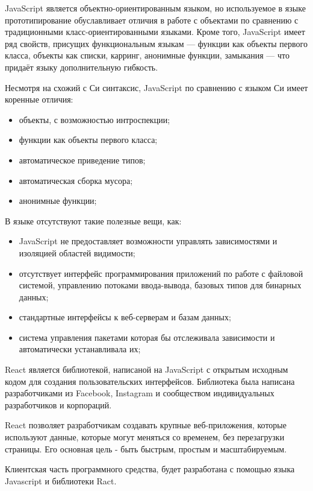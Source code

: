 JavaScript является объектно-ориентированным языком, но используемое в языке прототипирование обуславливает отличия в работе с объектами по сравнению с традиционными класс-ориентированными языками. Кроме того, JavaScript имеет ряд свойств, присущих функциональным языкам — функции как объекты первого класса, объекты как списки, карринг, анонимные функции, замыкания — что придаёт языку дополнительную гибкость.

Несмотря на схожий с Си синтаксис, JavaScript по сравнению с языком Си имеет коренные отличия:

\begin{itemize}
	\item объекты, с возможностью интроспекции;
	\item функции как объекты первого класса;
	\item автоматическое приведение типов;
	\item автоматическая сборка мусора;
	\item анонимные функции;
\end{itemize}

В языке отсутствуют такие полезные вещи, как:

\begin{itemize}
	\item JavaScript не предоставляет возможности управлять зависимостями и изоляцией областей видимости;
	\item отсутствует интерфейс программирования приложений по работе с файловой системой, управлению потоками ввода-вывода, базовых типов для бинарных данных;
	\item стандартные интерфейсы к веб-серверам и базам данных;
	\item система управления пакетами которая бы отслеживала зависимости и автоматически устанавливала их;
\end{itemize}

React является библиотекой, написаной на JavaScript с открытым исходным кодом для создания пользовательских интерфейсов. Библиотека была написана разработчиками из Facebook, Instagram и сообществом индивидуальных разработчиков и корпораций. 

React позволяет разработчикам создавать крупные веб-приложения, которые используют данные, которые могут меняться со временем, без перезагрузки страницы. Его основная цель - быть быстрым, простым и масштабируемым. 

Клиентская часть программного средства, будет разработана с помощью языка Javascript и библиотеки Ract.


